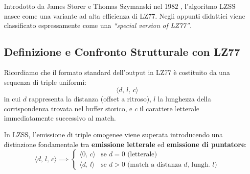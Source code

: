 Introdotto da James Storer e Thomas Szymanski nel 1982 \cite{storer1982lzss}, l'algoritmo LZSS nasce come una variante ad alta efficienza di LZ77. Negli appunti didattici viene classificato espressamente come una \textit{``special version of LZ77''}.

\FloatBarrier
\subsection{Definizione e Confronto Strutturale con LZ77}
\label{subsec:confronto-lz77-lzss}

Ricordiamo che il formato standard dell'output in LZ77 \`e costituito da una sequenza di triple uniformi:
\begin{equation}
  \langle d, \, l, \, c \rangle
\end{equation}
in cui $d$ rappresenta la distanza (offset a ritroso), $l$ la lunghezza della corrispondenza trovata nel buffer storico, e $c$ il carattere letterale immediatamente successivo al match.

In LZSS, l'emissione di triple omogenee viene superata introducendo una distinzione fondamentale tra \textbf{emissione letterale} ed \textbf{emissione di puntatore}:
\begin{equation}
  \langle d, \, l, \, c \rangle \implies \begin{cases}
    \langle 0, \, c \rangle & \text{se } d = 0 \text{ (letterale)} \\
    \langle d, \, l \rangle & \text{se } d > 0 \text{ (match a distanza $d$, lungh. $l$)}
  \end{cases}
\end{equation}


